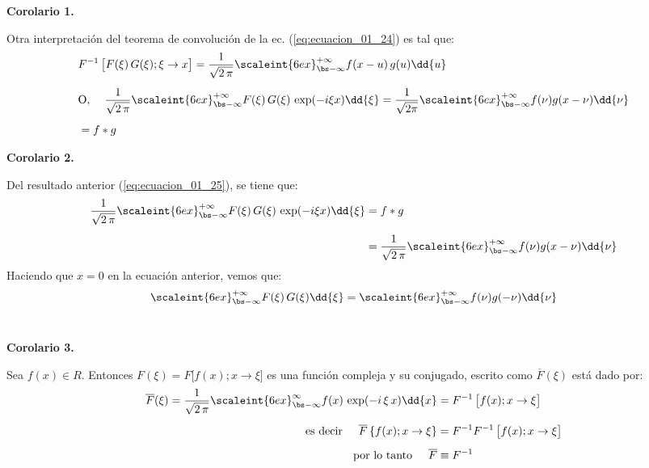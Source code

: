 \textbf{Corolario 1.}

Otra interpretación del teorema de convolución de la ec. (\ref{eq:ecuacion_01_24}) es tal que:
\begin{align}
\begin{aligned}[b]
&F^{-1} \, \big[F (\xi) \, G(\xi); \xi \to x\big] = \dfrac{1}{\sqrt{2 \, \pi}} \scaleint{6ex}_{\bs -\infty}^{+\infty} f(x - u) \, g(u) \dd{u} \\[0.5em]
&\mbox{O}, \hspace{0.4cm} \dfrac{1}{\sqrt{2 \, \pi}} \scaleint{6ex}_{\bs -\infty}^{+\infty} F (\xi) \, G(\xi) \, \exp(- i \xi x) \dd{\xi} = \dfrac{1}{\sqrt{2 \pi}} \scaleint{6ex}_{\bs -\infty}^{+\infty} f(\nu) g(x - \nu) \dd{\nu} \\[0.5em]
&= f * g
\end{aligned}
\label{eq:ecuacion_01_25}
\end{align}

\textbf{Corolario 2.}

Del resultado anterior (\ref{eq:ecuacion_01_25}), se tiene que:
\begin{align*}
\dfrac{1}{\sqrt{2 \, \pi}} \scaleint{6ex}_{\bs -\infty}^{+\infty} F (\xi) \, G(\xi) \, \exp(- i \xi x) \dd{\xi} &= f * g \\[0.5em]
&= \dfrac{1}{\sqrt{2 \, \pi}} \scaleint{6ex}_{\bs -\infty}^{+\infty} f(\nu) g(x - \nu) \dd{\nu}
\end{align*}
Haciendo que $x = 0$ en la ecuación anterior, vemos que:
\begin{align}
\scaleint{6ex}_{\bs -\infty}^{+\infty} F (\xi) \, G(\xi) \dd{\xi} = \scaleint{6ex}_{\bs -\infty}^{+\infty} f(\nu) g(-\nu) \dd{\nu}
\label{eq:ecuacion_01_26}
\end{align}
\\
\bigskip

\textbf{Corolario 3.}

Sea $f (x) \in R$. Entonces $F (\xi) = F \big[f (x); x \to \xi\big]$ es una función compleja y su conjugado, escrito como $\overline{F}(\xi)$ está dado por:
\begin{align}
\begin{aligned}[b]
\overline{F}(\xi) = \dfrac{1}{\sqrt{2 \, \pi}} \scaleint{6ex}_{\bs -\infty}^{\infty} f (x) \, \exp(-i \, \xi \, x) \dd{x} &= F^{-1} \, \big[f (x); x \to \xi\big] \\[0.5em]
\mbox{es decir} \hspace{0.5cm} \overline{F} \left\{f (x); x \to \xi \right\} &= F^{-1} F^{-1} \, \big[f (x); x \to \xi \big] \\[0.5em]
\mbox{por lo tanto} \hspace{0.5cm} \overline{F} &\equiv F^{-1}
\end{aligned}
\label{eq:ecuacion_01_27}
\end{align}
\\
\bigskip

